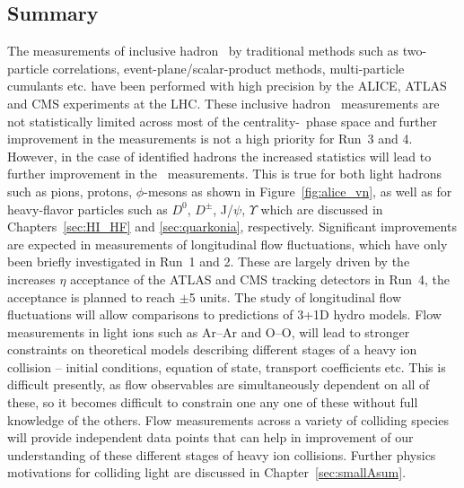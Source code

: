 \subsection{Summary}
The measurements of inclusive hadron \vn\ by traditional methods such as 
  two-particle correlations, event-plane/scalar-product methods, 
  multi-particle cumulants etc. have been performed with high precision 
  by the ALICE, ATLAS and CMS experiments at the LHC.
These inclusive hadron \vn\ measurements are not statistically limited 
  across most of the centrality-\pt\ phase space and further improvement 
  in the measurements is not a high priority for Run~3 and 4.
However, in the case of identified hadrons the increased statistics 
  will lead to further improvement in the \vn\ measurements.
This is true for both light hadrons such as pions, protons, $\phi$-mesons 
  as shown in Figure~\ref{fig:alice_vn}, as well as for heavy-flavor 
  particles such as $D^0$, $D^{\pm}$, J/$\psi$, $\Upsilon$ which are 
  discussed in Chapters~\ref{sec:HI_HF} and \ref{sec:quarkonia}, respectively.
%
Significant improvements are expected in measurements of 
  longitudinal flow fluctuations, which have only been briefly investigated
  in Run~1 and 2.
These are largely driven by the increases $\eta$ acceptance of the
  ATLAS and CMS tracking detectors in Run~4, the acceptance is planned 
  to reach $\pm$5 units.
The study of longitudinal flow fluctuations will allow comparisons to predictions 
  of 3+1D hydro models.
%
Flow measurements in light ions such as Ar--Ar and O--O, will lead 
  to stronger constraints on theoretical models describing different 
  stages of a heavy ion collision 
  -- initial conditions, equation of state, transport coefficients etc.
This is difficult presently, as flow observables are simultaneously dependent 
  on all of these, so it becomes difficult to constrain one any one of these 
  without full knowledge of the others.
Flow measurements across a variety of colliding species will provide independent 
  data points that can help in improvement of our understanding of these different 
  stages of heavy ion collisions.
Further physics motivations for colliding light are discussed in Chapter~\ref{sec:smallAsum}.

